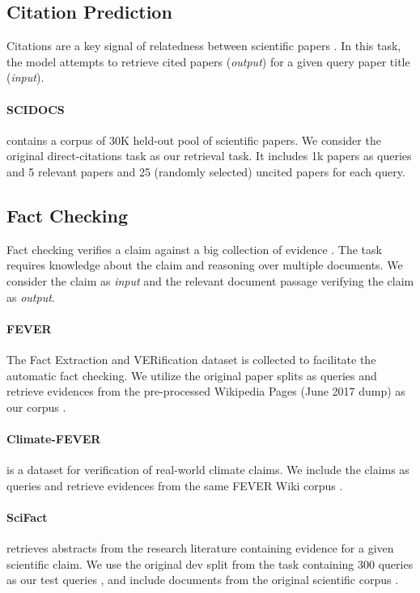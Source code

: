 \documentclass[11pt]{article}
\begin{document}
\subsection{Citation Prediction}
Citations are a key signal of relatedness between scientific papers \cite{cohan-etal-2020-specter}. In this task, the model attempts to retrieve cited papers (\textit{output}) for a given query paper title (\textit{input}).

\paragraph{SCIDOCS} \cite{cohan-etal-2020-specter} contains a corpus  of 30K held-out pool of scientific papers. We consider the original direct-citations task as our retrieval task. It includes 1k papers as queries  and 5 relevant papers and 25 (randomly selected) uncited papers for each query. 

\subsection{Fact Checking}
Fact checking verifies a claim against a big collection of evidence \cite{thorne-etal-2018-fever}. The task requires knowledge about the claim and reasoning over multiple documents. We consider the claim as \textit{input} and the relevant document passage verifying the claim as \textit{output}.

\paragraph{FEVER} \cite{thorne-etal-2018-fever} The Fact Extraction and VERification dataset is collected to facilitate the automatic fact checking. We utilize the original paper splits as queries  and retrieve evidences from the pre-processed Wikipedia Pages (June 2017 dump) as our corpus .

\paragraph{Climate-FEVER} \cite{diggelmann2020climatefever} is a dataset for verification of real-world climate claims. We include the claims as queries  and retrieve evidences from the same FEVER Wiki corpus .

\paragraph{SciFact} \cite{wadden-etal-2020-fact} retrieves abstracts from the research literature containing evidence for a given scientific claim. We use the original dev split from the task containing 300 queries as our test queries , and include documents from the original scientific corpus .
\end{document}

